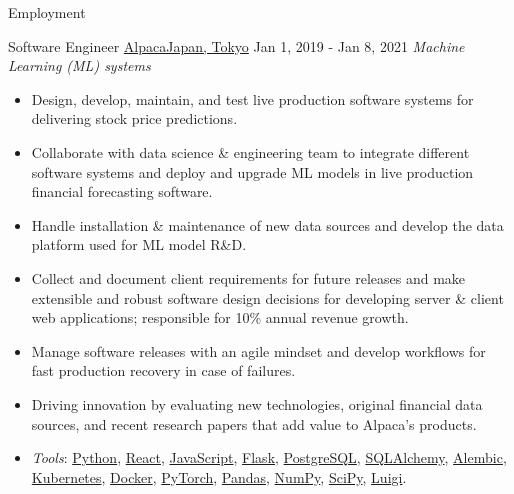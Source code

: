 \documentclass[]{mcdowellcv}
\begin{document}
\begin{cvsection}{Employment}
      \begin{cvsubsection}
        {Software Engineer}
        {\href{https://www.alpaca.markets/jp/about.html}{AlpacaJapan, Tokyo}}
        {Jan 1, 2019 - Jan 8, 2021}
        \textit{Machine Learning (ML) systems}
          \begin{itemize}
            \item
              Design, develop, maintain, and test live production software
              systems for delivering stock price predictions.
            \item
              Collaborate with data science \& engineering team to integrate
              different software systems and deploy and upgrade ML models in
              live production financial forecasting software.
            \item
              Handle installation \& maintenance of new data sources and
              develop the data platform used for ML model R\&D.
            \item
              Collect and document client requirements for future releases and
              make extensible and robust software design decisions for
              developing server \& client web applications; responsible for
              10\% annual revenue growth.
            \item
              Manage software releases with an agile mindset and develop
              workflows for fast production recovery in case of failures.
            \item
              Driving innovation by evaluating new technologies, original
              financial data sources, and recent research papers that add value
              to Alpaca's products.
            \item
              \textit{Tools}: \href{https://www.python.org/}{Python},
              \href{https://react.dev/}{React},
              \href{https://developer.mozilla.org/en-US/docs/Web/JavaScript}{JavaScript},
              \href{https://flask.palletsprojects.com/}{Flask},
              \href{https://www.postgresql.org/}{PostgreSQL},
              \href{https://www.sqlalchemy.org/}{SQLAlchemy},
              \href{https://alembic.sqlalchemy.org/en/latest/}{Alembic},
              \href{https://kubernetes.io/}{Kubernetes},
              \href{https://www.docker.com/}{Docker},
              \href{https://pytorch.org/}{PyTorch},
              \href{https://pandas.pydata.org/}{Pandas},
              \href{https://numpy.org/}{NumPy},
              \href{https://scipy.org/}{SciPy},
              \href{https://github.com/spotify/luigi}{Luigi}.
          \end{itemize}
      \end{cvsubsection}


\end{cvsection}
\end{document}
